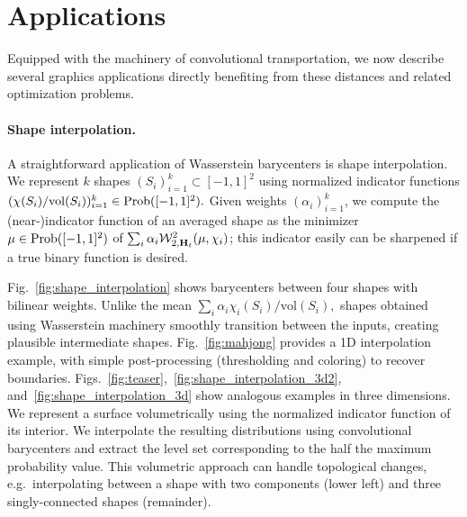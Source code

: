 
\section{Applications}\label{sec:applications}
\vspace{-2mm}

Equipped with the machinery of convolutional transportation, we now describe several graphics applications directly benefiting from these distances and related optimization problems.

\vspace{-2mm}
\paragraph*{Shape interpolation.} 

A straightforward application of Wasserstein barycenters is shape interpolation.  We represent $k$ shapes $(S_i)_{i=1}^k\subset [-1,1]^2$ using normalized indicator functions $(\chi(S_i)/\mathrm{vol}(S_i))_{i=1}^k\in\mathrm{Prob}([-1,1]^2).$  Given weights $(\alpha_i)_{i=1}^k$, we compute the (near-)indicator function of an averaged shape as the minimizer $\mu\in\mathrm{Prob}([-1,1]^2)$ of $\sum_i \alpha_i \mathcal W^2_{2,\mathbf{H}_t}(\mu,\chi_i)$; this indicator easily can be sharpened if a true binary function is desired.

Fig.~\ref{fig:shape_interpolation} shows barycenters between four shapes with bilinear weights.  Unlike the mean $\sum_i \alpha_i \chi_i(S_i)/\mathrm{vol}(S_i),$ shapes obtained using Wasserstein machinery smoothly transition between the inputs, creating plausible intermediate shapes.  Fig.~\ref{fig:mahjong} provides a 1D interpolation example, with simple post-processing (thresholding and coloring) to recover boundaries.  Figs.~\ref{fig:teaser},~\ref{fig:shape_interpolation_3d2}, and~\ref{fig:shape_interpolation_3d} show analogous examples in three dimensions.  We represent a surface volumetrically using the normalized indicator function of its interior.  We interpolate the resulting distributions using convolutional barycenters and extract the level set corresponding to the half the maximum probability value.  This volumetric approach can handle topological changes, e.g.\ interpolating between a shape with two components (lower left) and three singly-connected shapes (remainder).

